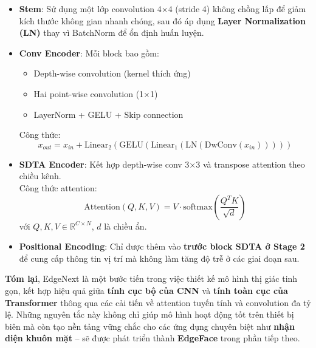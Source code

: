 \begin{itemize}
    \item \textbf{Stem}: Sử dụng một lớp convolution 4×4 (stride 4) không chồng lấp để giảm kích thước không gian nhanh chóng, sau đó áp dụng \textbf{Layer Normalization (LN)} thay vì BatchNorm để ổn định huấn luyện.
    \item \textbf{Conv Encoder}: Mỗi block bao gồm:
    \begin{itemize}
        \item Depth-wise convolution (kernel thích ứng)
        \item Hai point-wise convolution (1×1)
        \item LayerNorm + GELU + Skip connection
    \end{itemize}
    \textrightarrow Công thức:
    \[
    x_{out} = x_{in} + \text{Linear}_2(\text{GELU}(\text{Linear}_1(\text{LN}(\text{DwConv}(x_{in})))))
    \]
    \item \textbf{SDTA Encoder}: Kết hợp depth-wise conv 3×3 và transpose attention theo chiều kênh. \\
    \textrightarrow Công thức attention:
    \[
    \text{Attention}(Q, K, V) = V \cdot \text{softmax}\left(\frac{Q^T K}{\sqrt{d}}\right)
    \]
    với $Q, K, V \in \mathbb{R}^{C \times N}$, $d$ là chiều ẩn.
    \item \textbf{Positional Encoding}: Chỉ được thêm vào \textbf{trước block SDTA ở Stage 2} để cung cấp thông tin vị trí mà không làm tăng độ trễ ở các giai đoạn sau.
\end{itemize}

\textbf{Tóm lại}, EdgeNext là một bước tiến trong việc thiết kế mô hình thị giác tinh gọn, kết hợp hiệu quả giữa \textbf{tính cục bộ của CNN} và \textbf{tính toàn cục của Transformer} thông qua các cải tiến về attention tuyến tính và convolution đa tỷ lệ. Những nguyên tắc này không chỉ giúp mô hình hoạt động tốt trên thiết bị biên mà còn tạo nền tảng vững chắc cho các ứng dụng chuyên biệt như \textbf{nhận diện khuôn mặt} -- sẽ được phát triển thành \textbf{EdgeFace} trong phần tiếp theo.



